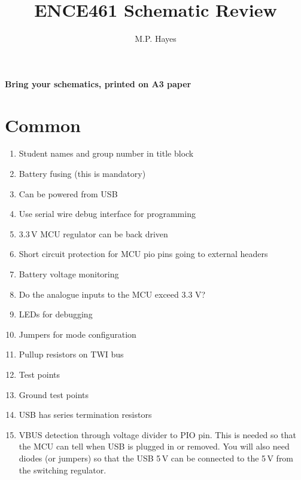 \documentclass[a4paper, 12pt]{article}
\title{ENCE461 Schematic Review}
\author{M.P. Hayes}
\date{}
\begin{document}
\maketitle


\begin{center}
\textbf{Bring your schematics, printed on A3 paper}
\end{center}


\section{Common}

\begin{enumerate}
\item Student names and group number in title block

\item Battery fusing (this is mandatory)

\item Can be powered from USB

\item Use serial wire debug interface for programming

\item 3.3\,V MCU regulator can be back driven

\item Short circuit protection for MCU pio pins going to external headers

\item Battery voltage monitoring

\item Do the analogue inputs to the MCU exceed 3.3 V?

\item LEDs for debugging

\item Jumpers for mode configuration

\item Pullup resistors on TWI bus

\item Test points

\item Ground test points

\item USB has series termination resistors

\item VBUS detection through voltage divider to PIO pin.  This is
  needed so that the MCU can tell when USB is plugged in or removed.
  You will also need diodes (or jumpers) so that the USB 5\,V can be
  connected to the 5\,V from the switching regulator.


\end{enumerate}
\end{document}
